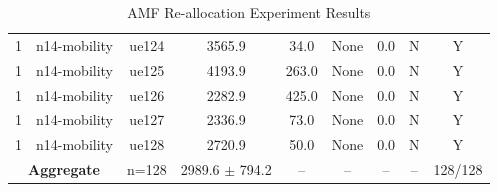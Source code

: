 \begin{table}[ht]
\begin{tabular}{|c|c|c|c|c|c|c|c|c|}
1 & n14-mobility & ue124 & 3565.9 & 34.0 & None & 0.0 & N & Y \\
1 & n14-mobility & ue125 & 4193.9 & 263.0 & None & 0.0 & N & Y \\
1 & n14-mobility & ue126 & 2282.9 & 425.0 & None & 0.0 & N & Y \\
1 & n14-mobility & ue127 & 2336.9 & 73.0 & None & 0.0 & N & Y \\
1 & n14-mobility & ue128 & 2720.9 & 50.0 & None & 0.0 & N & Y \\
\multicolumn{2}{|c|}{\textbf{Aggregate}} & n=128 & 2989.6 $\pm$ 794.2 & -- & -- & -- & -- & 128/128 \\
\hline
\end{tabular}
\caption{AMF Re-allocation Experiment Results}
\label{tab:amf_realloc}
\end{table}

